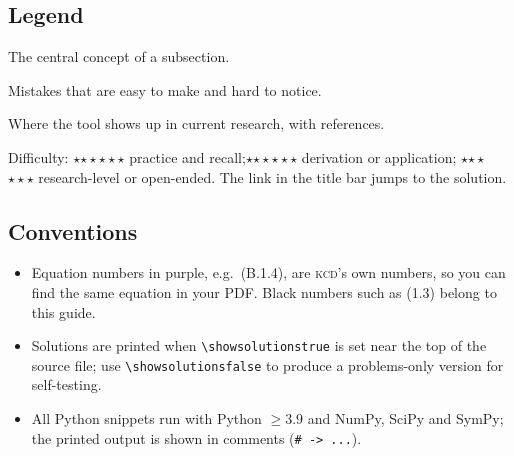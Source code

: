 \documentclass[11pt,letterpaper]{article}
\newif\ifshowsolutions
\numberwithin{equation}{section}
\newcommand{\Kundu}{\textnormal{\textsc{kcd}}}   %
\newcommand{\lvl}[1]{\ifcase#1\or$\star$\or$\star\star$\or$\star\star\star$\fi}
\begin{document}
\subsection*{Legend}
\begin{keyidea}The central concept of a subsection.\end{keyidea}\vspace{-4pt}
\begin{pitfall}Mistakes that are easy to make and hard to notice.\end{pitfall}\vspace{-4pt}
\begin{research}Where the tool shows up in current research, with references.\end{research}\vspace{-4pt}
\begin{tcolorbox}[guidebox,colback=exorange!3,colframe=exorange!85!black,
  title={Exercise~$n.m$\enspace\lvl{2}\enspace Exercise title\hfill{\normalfont\small solution\,$\blacktriangleright$}}]
Difficulty: \lvl{1} practice and recall;\quad \lvl{2} derivation or application;\quad
\lvl{3} research-level or open-ended. The link in the title bar jumps to the solution.
\end{tcolorbox}

\subsection*{Conventions}
\begin{itemize}
  \item Equation numbers in \textcolor{srcpurple}{purple}, e.g.\ (\textcolor{srcpurple}{B.1.4}),
        are \Kundu's own numbers, so you can find the same equation in your PDF.
        Black numbers such as (1.3) belong to this guide.
  \item Solutions are printed when \verb|\showsolutionstrue| is set near the top of the source file;
        use \verb|\showsolutionsfalse| to produce a problems-only version for self-testing.
  \item All Python snippets run with Python $\geq 3.9$ and NumPy, SciPy and SymPy; the printed
        output is shown in comments (\texttt{\# -> ...}).
\end{itemize}
\end{document}
